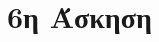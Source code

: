\documentclass[assignment2.tex]{subfiles}
\begin{document}
\section*{6η Άσκηση}


%
%
%
%
\end{document}
